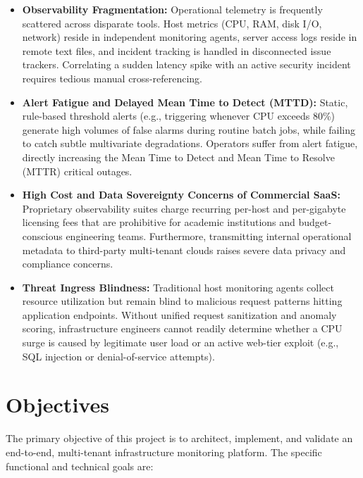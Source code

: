 \begin{itemize}
  \item \textbf{Observability Fragmentation:} Operational telemetry is frequently scattered across disparate tools. Host metrics (CPU, RAM, disk I/O, network) reside in independent monitoring agents, server access logs reside in remote text files, and incident tracking is handled in disconnected issue trackers. Correlating a sudden latency spike with an active security incident requires tedious manual cross-referencing.
  
  \item \textbf{Alert Fatigue and Delayed Mean Time to Detect (MTTD):} Static, rule-based threshold alerts (e.g., triggering whenever CPU exceeds 80\%) generate high volumes of false alarms during routine batch jobs, while failing to catch subtle multivariate degradations. Operators suffer from alert fatigue, directly increasing the Mean Time to Detect and Mean Time to Resolve (MTTR) critical outages.
  
  \item \textbf{High Cost and Data Sovereignty Concerns of Commercial SaaS:} Proprietary observability suites charge recurring per-host and per-gigabyte licensing fees that are prohibitive for academic institutions and budget-conscious engineering teams. Furthermore, transmitting internal operational metadata to third-party multi-tenant clouds raises severe data privacy and compliance concerns.
  
  \item \textbf{Threat Ingress Blindness:} Traditional host monitoring agents collect resource utilization but remain blind to malicious request patterns hitting application endpoints. Without unified request sanitization and anomaly scoring, infrastructure engineers cannot readily determine whether a CPU surge is caused by legitimate user load or an active web-tier exploit (e.g., SQL injection or denial-of-service attempts).
\end{itemize}

\section{Objectives}
The primary objective of this project is to architect, implement, and validate an end-to-end, multi-tenant infrastructure monitoring platform. The specific functional and technical goals are:

